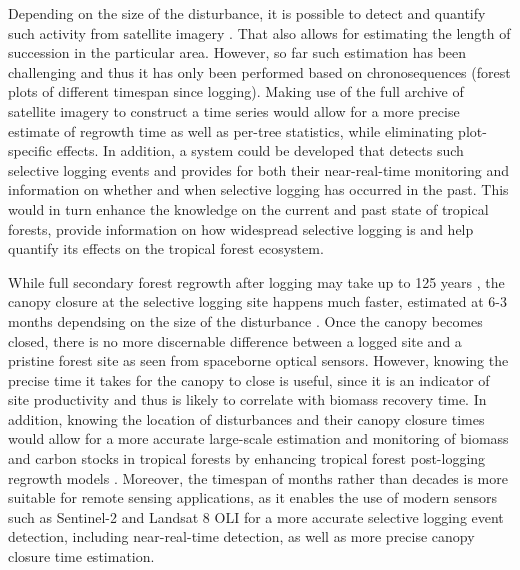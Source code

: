 \documentclass[a4paper,10pt]{article}
\begin{document}
Depending on the size of the disturbance, it is possible to detect and quantify such activity from satellite imagery \citep{shimizu_using_2017, frolking_forest_2009, broadbent_recovery_2006, keller_4._2004}. That also allows for estimating the length of succession in the particular area. However, so far such estimation has been challenging \citep{piponiot_carbon_2016} and thus it has only been performed based on chronosequences (forest plots of different timespan since logging). Making use of the full archive of satellite imagery to construct a time series would allow for a more precise estimate of regrowth time as well as per-tree statistics, while eliminating plot-specific effects. In addition, a system could be developed that detects such selective logging events and provides for both their near-real-time monitoring and information on whether and when selective logging has occurred in the past. This would in turn enhance the knowledge on the current and past state of tropical forests, provide information on how widespread selective logging is and help quantify its effects on the tropical forest ecosystem.

While full secondary forest regrowth after logging may take up to 125 years \citep{rutishauser_tree_2016}, the canopy closure at the selective logging site happens much faster, estimated at 6-3 months dependsing on the size of the disturbance \citep{broadbent_recovery_2006}. Once the canopy becomes closed, there is no more discernable difference between a logged site and a pristine forest site as seen from spaceborne optical sensors. However, knowing the precise time it takes for the canopy to close is useful, since it is an indicator of site productivity and thus is likely to correlate with biomass recovery time. In addition, knowing the location of disturbances and their canopy closure times would allow for a more accurate large-scale estimation and monitoring of biomass and carbon stocks in tropical forests by enhancing tropical forest post-logging regrowth models \citep{herault_growth_2010}. Moreover, the timespan of months rather than decades is more suitable for remote sensing applications, as it enables the use of modern sensors such as Sentinel-2 and Landsat 8 OLI for a more accurate selective logging event detection, including near-real-time detection, as well as more precise canopy closure time estimation.
\end{document}
